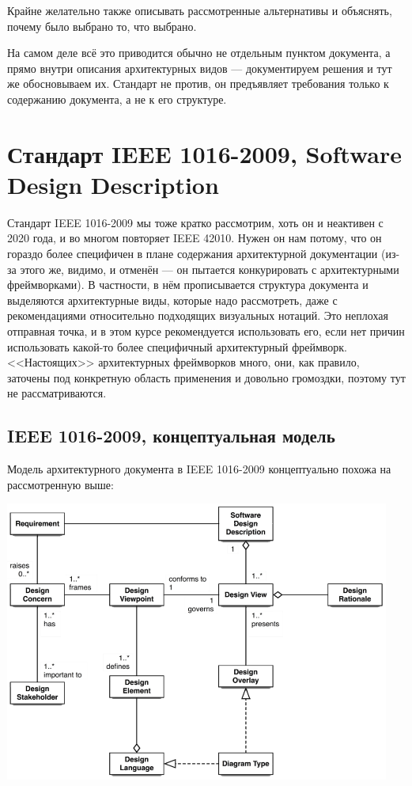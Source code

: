 \documentclass[a5paper]{article}
\begin{document}
\begin{itemize}
    Крайне желательно также описывать рассмотренные альтернативы и объяснять, почему было выбрано то, что выбрано.
    
    На самом деле всё это приводится обычно не отдельным пунктом документа, а прямо внутри описания архитектурных видов --- документируем решения и тут же обосновываем их. Стандарт не против, он предъявляет требования только к содержанию документа, а не к его структуре.
\end{itemize}

\section{Стандарт IEEE 1016-2009, Software Design Description}

Стандарт IEEE 1016-2009 мы тоже кратко рассмотрим, хоть он и неактивен с 2020 года, и во многом повторяет IEEE 42010. Нужен он нам потому, что он гораздо более специфичен в плане содержания архитектурной документации (из-за этого же, видимо, и отменён --- он пытается конкурировать с архитектурными фреймворками). В частности, в нём прописывается структура документа и выделяются архитектурные виды, которые надо рассмотреть, даже с рекомендациями относительно подходящих визуальных нотаций. Это неплохая отправная точка, и в этом курсе рекомендуется использовать его, если нет причин использовать какой-то более специфичный архитектурный фреймворк. <<Настоящих>> архитектурных фреймворков много, они, как правило, заточены под конкретную область применения и довольно громоздки, поэтому тут не рассматриваются.

\subsection{IEEE 1016-2009, концептуальная модель}

Модель архитектурного документа в IEEE 1016-2009 концептуально похожа на рассмотренную выше:

\begin{center}
    \includegraphics[width=0.95\textwidth]{ieee1016Concepts.png}
\end{center}
\end{document}
